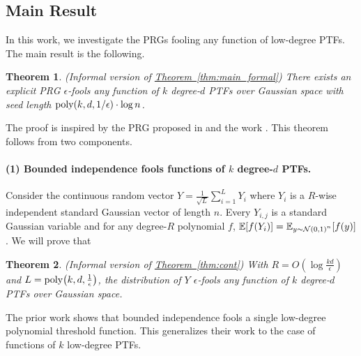\documentclass[12pt]{article}
\newtheorem{theorem}{Theorem}[section]
\newcommand{\thm}[1]{\hyperref[thm:#1]{Theorem~\ref*{thm:#1}}}
\begin{document}
\subsection{Main Result}





In this work, we investigate the PRGs fooling any function of low-degree PTFs. The main result is the following.

\begin{theorem}\label{thm:main}(Informal version of \thm{main_formal})
	There exists an explicit PRG
	$\epsilon$-fools any function of $k$ degree-$d$ PTFs over Gaussian space
	with seed length $\mathrm{poly}\!\left(k,d,1/\epsilon\right)\cdot\log n$.
\end{theorem}

The proof is inspired by the PRG proposed in \cite{Kan11b} and the work \cite{KM22}. This theorem follows from two components.

\paragraph{(1) Bounded independence fools functions of $k$ degree-$d$ PTFs.}
Consider the continuous random vector
$Y = \frac{1}{\sqrt{L}} \sum_{i=1}^{L} Y_i$
where $Y_i$ is a $R$-wise independent standard Gaussian vector of length $n$.
Every $Y_{i,j}$ is a standard Gaussian variable and for any degree-$R$ polynomial $f$,
$\operatorname*{\mathbb{E}}\!\left[f(Y_i)\right] = \operatorname*{\mathbb{E}}_{\substack{y\sim\mathcal{N}(0,1)^n}}\!\left[f(y)\right]$.
We will prove that
\begin{theorem}(Informal version of \thm{cont})
	With $R = O({\log \frac{kd}{\epsilon}})$ and $L=\mathrm{poly}\!\left(k, d, \frac{1}{\epsilon}\right)$, the distribution of $Y$
	$\epsilon$-fools any function of $k$ degree-$d$ PTFs over Gaussian space.
\end{theorem}
\noindent The prior work \cite{KM22} shows that bounded independence fools a single low-degree polynomial threshold function. This generalizes their work to the case of functions of $k$ low-degree PTFs.
\end{document}
